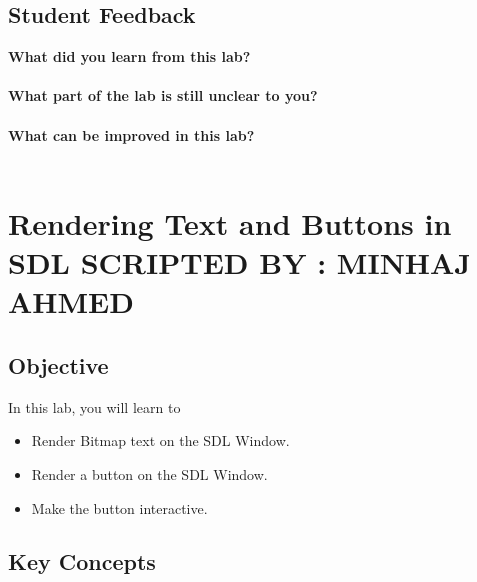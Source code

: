 \documentclass[11pt,fleqn]{book} %
\begin{document}
\newpage
\section{Student Feedback}
\textbf{What did you learn from this lab?}\\
\noindent\fbox{\parbox{\textwidth}{
  }
}\\
\textbf{What part of the lab is still unclear to you?}\\
\noindent\fbox{\parbox{\textwidth}{
  }
}\\
\textbf{What can be improved in this lab?}\\ 
\noindent\fbox{\parbox{\textwidth}{
  }
}\\

\newpage
\pagestyle{empty} %

\cleardoublepage %

\pagestyle{fancy} %


\chapter{Rendering Text and Buttons in SDL \hspace{1mm} {\textsc{\small SCRIPTED BY : MINHAJ AHMED}}}

\section{Objective}

In this lab, you will learn to

\begin{itemize}
\item Render Bitmap text on the SDL Window.
\item Render a button on the SDL Window.
\item Make the button interactive.
\end{itemize}

\section{Key Concepts}
\end{document}
